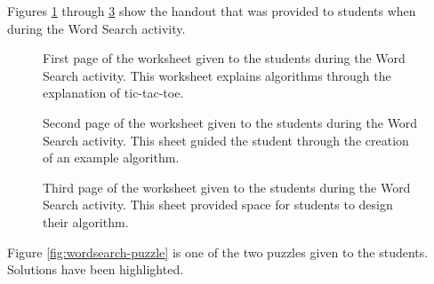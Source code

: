 	\label{sec:wordsearchhandout}
	Figures \ref{fig:StudentWorksheet1} through \ref{fig:StudentWorksheet3} show the handout that was provided to students when during the Word Search activity.


\begin{figure}%
   \centering
   	\fbox{
   	}
   \caption[Word Search handout, page 1.]{First page of the worksheet given to the students during the Word Search activity. This worksheet explains algorithms through the explanation of tic-tac-toe.}
   \label{fig:StudentWorksheet1}
\end{figure}

\begin{figure}%
   \centering
   	\fbox{
		}
   \caption[Word Search handout, page 2.]{Second page of the worksheet given to the students during the Word Search activity. This sheet guided the student through the creation of an example algorithm.}
   \label{fig:StudentWorksheet2}
\end{figure}

\begin{figure}%
   \centering
   	\fbox{
   	}
   \caption[Word Search handout, page 3.]{Third page of the worksheet given to the students during the Word Search activity. This sheet provided space for students to design their algorithm.}
   \label{fig:StudentWorksheet3}
\end{figure}

	\label{sec:wordsearchpuzzle}
	Figure \ref{fig:wordsearch-puzzle} is one of the two puzzles given to the students. Solutions have been highlighted.


